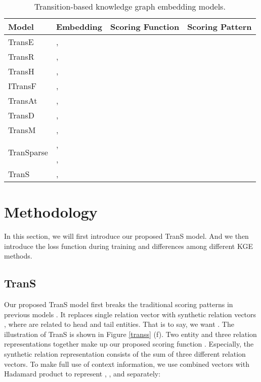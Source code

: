 \documentclass[11pt]{article}
\begin{document}
\begin{table*}[!ht]
\small
\begin{center}
\begin{tabular}{l l l l }
\toprule
Model & Embedding & Scoring Function & Scoring Pattern \\
\midrule
TransE&	, 		&	 & \\
TransR	&		, 		&	 & \\
TransH	&	, 		&	 & \\
ITransF	&	 ,		&	 	 & \\
TransAt	&	,		&		 & \\
TransD	&	,		&		 & \\
TransM	&	,		&		 & \\
\multirow{2}{30pt}{TranSparse}	&,		&		 & \\
&	,	&	 & \\
\midrule
\multirow{2}{30pt}{TranS} 	&\multirow{2}{150pt}{, 	} 		&	\multirow{2}{100pt}{} & \\
&&&\\
\bottomrule 
\end{tabular}
\caption{Transition-based knowledge graph embedding models.}\label{tab:related}
\end{center}
\end{table*}

\section{Methodology}
In this section, we will first introduce  our proposed TranS model. 
And we then introduce the loss function during training and differences among different KGE methods.

\subsection{TranS}
Our proposed TranS model first breaks the traditional scoring patterns    in previous models \cite{bordes2013translating,wang2014knowledge,fan2014transition,lin2015learning,chao2020pairre,long2021triplere,wang2022interht}. It replaces single relation vector  with synthetic relation vectors , where  are related to head and tail entities.
That is to say, we want  .
The illustration of TranS is shown in Figure \ref{transs} (f). 
Two entity and three relation representations together make up our proposed scoring function .
Especially,  the synthetic relation representation consists of the sum of three different relation vectors.
To make full use of context information, we use combined vectors with Hadamard product to represent , ,  and  separately:
\end{document}
